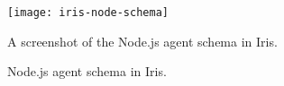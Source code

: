 \begin{figure}[H]
\begin{tcolorbox}
\begin{center}
\texttt{[image: iris-node-schema]}
\end{center}
A screenshot of the Node.js agent schema in Iris.
\end{tcolorbox}
\caption{Node.js agent schema in Iris.}
\end{figure}